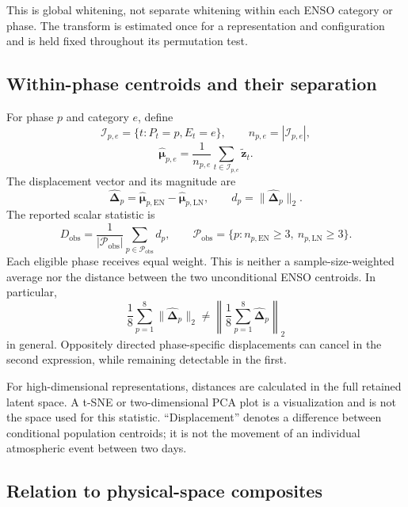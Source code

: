 \documentclass[11pt]{article}
\newcommand{\EN}{\mathrm{EN}}
\newcommand{\LN}{\mathrm{LN}}
\begin{document}
This is global whitening, not separate whitening within each ENSO category or phase. The transform is estimated once for a representation and configuration and is held fixed throughout its permutation test.

\subsection{Within-phase centroids and their separation}

For phase $p$ and category $e$, define
\begin{equation}
\mathcal I_{p,e}=\{t:P_t=p,E_t=e\},\qquad
n_{p,e}=|\mathcal I_{p,e}|,
\end{equation}
\begin{equation}
\widehat{\boldsymbol\mu}_{p,e}
=\frac{1}{n_{p,e}}\sum_{t\in\mathcal I_{p,e}}
\widetilde{\mathbf z}_t.
\end{equation}
The displacement vector and its magnitude are
\begin{equation}
\widehat{\boldsymbol\Delta}_p
=\widehat{\boldsymbol\mu}_{p,\EN}
-\widehat{\boldsymbol\mu}_{p,\LN},
\qquad
d_p=\|\widehat{\boldsymbol\Delta}_p\|_2.
\label{eq:phase}
\end{equation}
The reported scalar statistic is
\begin{equation}
D_{\mathrm{obs}}=
\frac{1}{|\mathcal P_{\mathrm{obs}}|}
\sum_{p\in\mathcal P_{\mathrm{obs}}}d_p,
\qquad
\mathcal P_{\mathrm{obs}}=
\{p:n_{p,\EN}\geq3,\ n_{p,\LN}\geq3\}.
\label{eq:mean}
\end{equation}
Each eligible phase receives equal weight. This is neither a sample-size-weighted average nor the distance between the two unconditional ENSO centroids. In particular,
\begin{equation}
\frac{1}{8}\sum_{p=1}^8\|\widehat{\boldsymbol\Delta}_p\|_2
\ne
\left\|\frac{1}{8}\sum_{p=1}^8\widehat{\boldsymbol\Delta}_p\right\|_2
\end{equation}
in general. Oppositely directed phase-specific displacements can cancel in the second expression, while remaining detectable in the first.

For high-dimensional representations, distances are calculated in the full retained latent space. A t-SNE or two-dimensional PCA plot is a visualization and is not the space used for this statistic. ``Displacement'' denotes a difference between conditional population centroids; it is not the movement of an individual atmospheric event between two days.

\subsection{Relation to physical-space composites}
\end{document}
